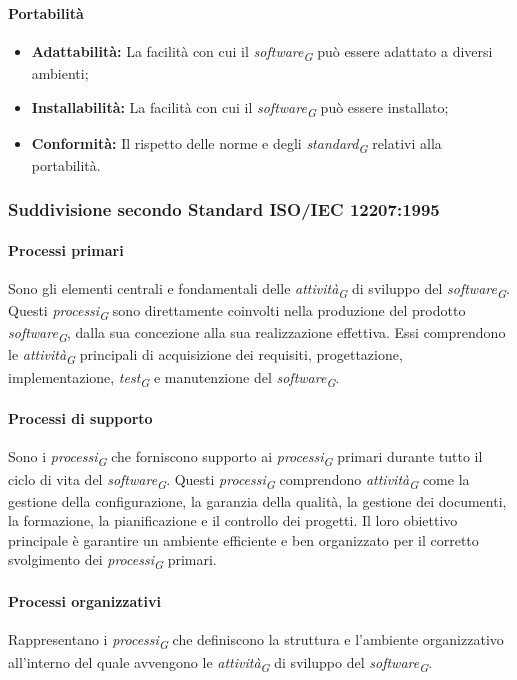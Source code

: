 \paragraph{Portabilità}
\begin{itemize}
    \item \textbf{Adattabilità:} La facilità con cui il \textit{software}\textsubscript{\textit{G}} può essere adattato a diversi ambienti;
    \item \textbf{Installabilità:} La facilità con cui il \textit{software}\textsubscript{\textit{G}} può essere installato;
    \item \textbf{Conformità:} Il rispetto delle norme e degli \textit{standard}\textsubscript{\textit{G}} relativi alla portabilità.
\end{itemize}


\subsubsection{Suddivisione secondo Standard ISO/IEC 12207:1995}

\paragraph{Processi primari}
Sono gli elementi centrali e fondamentali delle \textit{attività}\textsubscript{\textit{G}} di sviluppo del \textit{software}\textsubscript{\textit{G}}. Questi \textit{processi}\textsubscript{\textit{G}} sono direttamente coinvolti nella produzione del prodotto \textit{software}\textsubscript{\textit{G}}, dalla sua concezione alla sua realizzazione effettiva. Essi comprendono le \textit{attività}\textsubscript{\textit{G}} principali di acquisizione dei requisiti, progettazione, implementazione, \textit{test}\textsubscript{\textit{G}} e manutenzione del \textit{software}\textsubscript{\textit{G}}.

\paragraph{Processi di supporto}
Sono i \textit{processi}\textsubscript{\textit{G}} che forniscono supporto ai \textit{processi}\textsubscript{\textit{G}} primari durante tutto il ciclo di vita del \textit{software}\textsubscript{\textit{G}}. Questi \textit{processi}\textsubscript{\textit{G}} comprendono \textit{attività}\textsubscript{\textit{G}} come la gestione della configurazione, la garanzia della qualità, la gestione dei documenti, la formazione, la pianificazione e il controllo dei progetti. Il loro obiettivo principale è garantire un ambiente efficiente e ben organizzato per il corretto svolgimento dei \textit{processi}\textsubscript{\textit{G}} primari.

\paragraph{Processi organizzativi}
Rappresentano i \textit{processi}\textsubscript{\textit{G}} che definiscono la struttura e l'ambiente organizzativo all'interno del quale avvengono le \textit{attività}\textsubscript{\textit{G}} di sviluppo del \textit{software}\textsubscript{\textit{G}}. 
